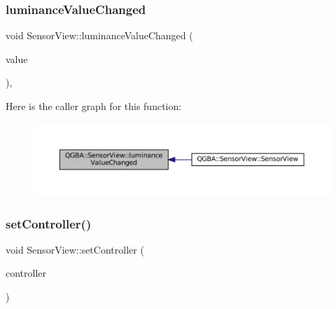 \subsubsection{\texorpdfstring{luminance\+Value\+Changed}{luminanceValueChanged}}
{\footnotesize\ttfamily void Sensor\+View\+::luminance\+Value\+Changed (\begin{DoxyParamCaption}\item[{\mbox{\hyperlink{ioapi_8h_a787fa3cf048117ba7123753c1e74fcd6}{int}}}]{value }\end{DoxyParamCaption})\hspace{0.3cm}{\ttfamily [private]}, {\ttfamily [slot]}}

Here is the caller graph for this function\+:
\nopagebreak
\begin{figure}[H]
\begin{center}
\leavevmode
\includegraphics[width=350pt]{class_q_g_b_a_1_1_sensor_view_a76f391e13618d7f97f37076ce16ebd64_icgraph}
\end{center}
\end{figure}
\mbox{\label{class_q_g_b_a_1_1_sensor_view_aef94bd97606a185f823636106bd0b2ca}} 
\subsubsection{\texorpdfstring{set\+Controller()}{setController()}}
{\footnotesize\ttfamily void Sensor\+View\+::set\+Controller (\begin{DoxyParamCaption}\item[{std\+::shared\+\_\+ptr$<$ \mbox{\hyperlink{class_q_g_b_a_1_1_core_controller}{Core\+Controller}} $>$}]{controller }\end{DoxyParamCaption})}

